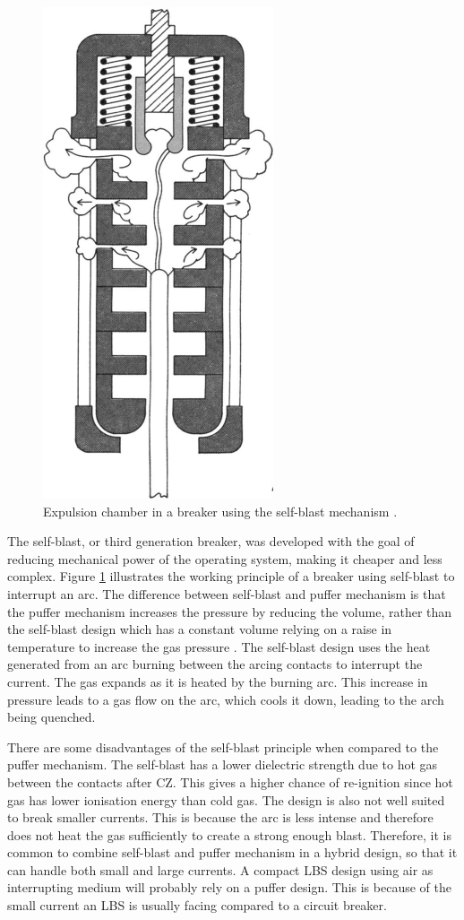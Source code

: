\documentclass[10pt,a4paper,twoside]{article}
\begin{document}
\begin{figure} [H]
\centering
\includegraphics[scale=0.5]{Bilder/Theory/selfBlast.png}
\caption{Expulsion chamber in a breaker using the self-blast mechanism \cite{bib:CBAC}.} \label{fig:selfBlast}
\end{figure}

The self-blast, or third generation breaker, was developed with the goal of reducing mechanical power of the operating system, making it cheaper and less complex. Figure \ref{fig:selfBlast} illustrates the working principle of a breaker using self-blast to interrupt an arc. The difference between self-blast and puffer mechanism is that the puffer mechanism increases the pressure by reducing the volume, rather than the self-blast design which has a constant volume relying on a raise in temperature to increase the gas pressure \cite{bib:CBAC}. The self-blast design uses the heat generated from an arc burning between the arcing contacts to interrupt the current. The gas expands as it is heated by the burning arc. This increase in pressure leads to a gas flow on the arc, which cools it down, leading to the arch being quenched.

There are some disadvantages of the self-blast principle when compared to the puffer mechanism. The self-blast has a lower dielectric strength due to hot gas between the contacts after CZ. This gives a higher chance of re-ignition since hot gas has lower ionisation energy than cold gas. The design is also not well suited to break smaller currents. This is because the arc is less intense and therefore does not heat the gas sufficiently to create a strong enough blast. Therefore, it is common to combine self-blast and puffer mechanism in a hybrid design, so that it can handle both small and large currents. A compact LBS design using air as interrupting medium will probably rely on a puffer design. This is because of the small current an LBS is usually facing compared to a circuit breaker.
\end{document}
